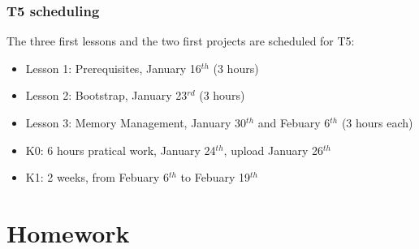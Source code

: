 \begin{frame}
  \frametitle{T5 scheduling}

  The three first lessons and the two first projects are scheduled for
  T5:

  \begin{itemize}
  \item
    Lesson 1: Prerequisites, January 16$^{th}$ (3 hours)
  \item
    Lesson 2: Bootstrap, January 23$^{rd}$ (3 hours)
  \item
    Lesson 3: Memory Management, January 30$^{th}$ and Febuary 6$^{th}$ (3 hours each)
  \end{itemize}

  \begin{itemize}
  \item
    K0: 6 hours pratical work, January 24$^{th}$, upload January 26$^{th}$
  \item
    K1: 2 weeks, from Febuary 6$^{th}$ to Febuary 19$^{th}$
  \end{itemize}

\end{frame}

%
%

\section{Homework}


